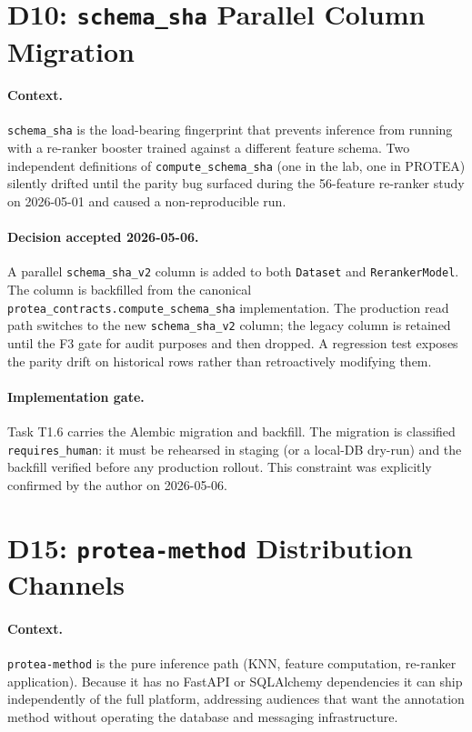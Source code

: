 \section{D10: \texttt{schema\_sha} Parallel Column Migration}
\label{app:adr-d10}

\paragraph{Context.}
\texttt{schema\_sha} is the load-bearing fingerprint that prevents inference
from running with a re-ranker booster trained against a different feature
schema. Two independent definitions of \texttt{compute\_schema\_sha} (one in
the lab, one in PROTEA) silently drifted until the parity bug surfaced during
the 56-feature re-ranker study on 2026-05-01 and caused a non-reproducible run.

\paragraph{Decision accepted 2026-05-06.}
A parallel \texttt{schema\_sha\_v2} column is added to both \texttt{Dataset}
and \texttt{RerankerModel}. The column is backfilled from the canonical
\texttt{protea\_contracts.compute\_schema\_sha} implementation. The production
read path switches to the new \texttt{schema\_sha\_v2} column; the legacy column
is retained until the F3 gate for audit purposes and then dropped. A regression
test exposes the parity drift on historical rows rather than retroactively
modifying them.

\paragraph{Implementation gate.}
Task T1.6 carries the Alembic migration and backfill. The migration is
classified \texttt{requires\_human}: it must be rehearsed in staging (or a
local-DB dry-run) and the backfill verified before any production rollout.
This constraint was explicitly confirmed by the author on 2026-05-06.

\section{D15: \texttt{protea-method} Distribution Channels}
\label{app:adr-d15}

\paragraph{Context.}
\texttt{protea-method} is the pure inference path (KNN, feature computation,
re-ranker application). Because it has no FastAPI or SQLAlchemy dependencies
it can ship independently of the full platform, addressing audiences that want
the annotation method without operating the database and messaging
infrastructure.

